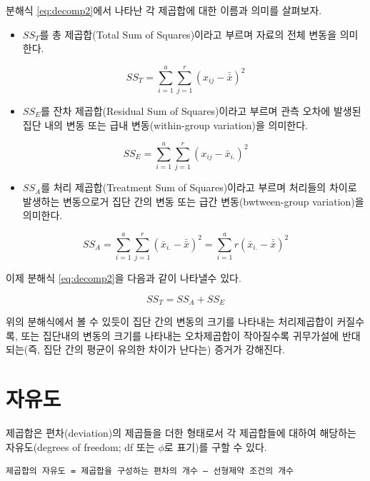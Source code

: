 \documentclass[
]{book}
\providecommand{\tightlist}{%
  \setlength{\itemsep}{0pt}\setlength{\parskip}{0pt}}
\begin{document}
분해식 \eqref{eq:decomp2}에서 나타난 각 제곱합에 대한 이름과 의미를 살펴보자.

\begin{itemize}
\tightlist
\item
  \(SS_T\)를 총 제곱합(Total Sum of Squares)이라고 부르며 자료의 전체 변동을 의미한다.
\end{itemize}

\[ SS_T = \sum_{i=1}^a \sum_{j=1}^r (x_{ij} - \bar{\bar {x}})^2 \]

\begin{itemize}
\tightlist
\item
  \(SS_E\)를 잔차 제곱합(Residual Sum of Squares)이라고 부르며 관측 오차에 발생된 집단 내의 변동 또는 급내 변동(within-group variation)을 의미한다.
\end{itemize}

\[ SS_E = \sum_{i=1}^a \sum_{j=1}^r  ( x_{ij} - \bar {x}_{i.} )^2 \]

\begin{itemize}
\tightlist
\item
  \(SS_A\)를 처리 제곱합(Treatment Sum of Squares)이라고 부르며 처리들의 차이로 발생하는 변동으로거 집단 간의 변동 또는 급간 변동(bwtween-group variation)을 의미한다.
\end{itemize}

\[ SS_A = \sum_{i=1}^a \sum_{j=1}^r (\bar {x}_{i.} - \bar{\bar {x}} )^2 =\sum_{i=1}^a r (\bar {x}_{i.} - \bar{\bar {x}} )^2 \]

이제 분해식 \eqref{eq:decomp2}을 다음과 같이 나타낼수 있다.

\begin{equation}
SS_T = SS_A + SS_E
\label{eq:decomp3}
\end{equation}

위의 분해식에서 볼 수 있듯이 집단 간의 변동의 크기를 나타내는 처리제곱합이 커질수록, 또는 집단내의 변동의 크기를 나타내는 오차제곱합이 작아질수록 귀무가설에 반대되는(즉, 집단 간의 평균이 유의한 차이가 난다는) 증거가 강해진다.

\hypertarget{uxc790uxc720uxb3c4}{%
\section{자유도}\label{uxc790uxc720uxb3c4}}

제곱합은 편차(deviation)의 제곱들을 더한 형태로서 각 제곱합들에 대하여 해당하는 자유도(degrees of freedom; df 또는 \(\phi\)로 표기)를 구할 수 있다.

\begin{verbatim}
제곱합의 자유도 = 제곱합을 구성하는 편차의 개수 – 선형제약 조건의 개수 
\end{verbatim}
\end{document}
